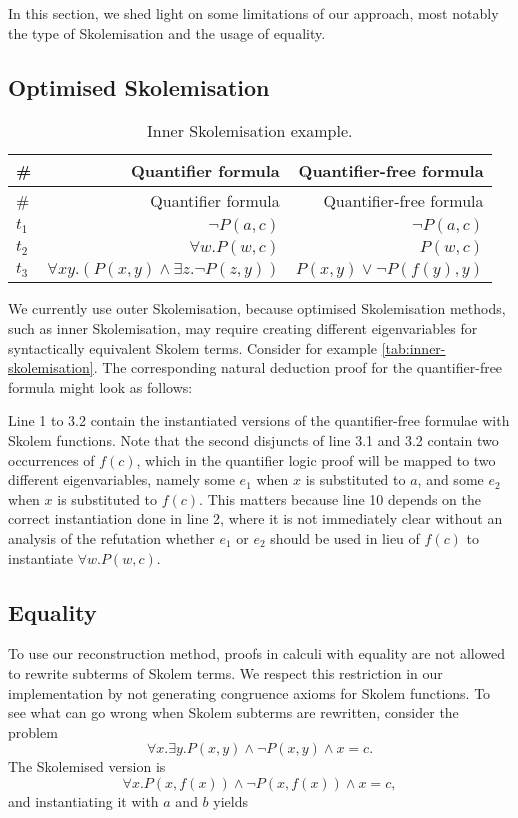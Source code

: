 \documentclass[]{article}
\begin{document}
In this section, we shed light on some limitations of our approach, most
notably the type of Skolemisation and the usage of equality.

\subsection{Optimised Skolemisation}\label{optimised-skolemisation}

\begin{longtable}[c]{@{}lrr@{}}
\caption{Inner Skolemisation example.
\label{tab:inner-skolemisation}}\tabularnewline
\toprule
\# & Quantifier formula & Quantifier-free formula\tabularnewline
\midrule
\endfirsthead
\toprule
\# & Quantifier formula & Quantifier-free formula\tabularnewline
\midrule
\endhead
\(t_1\) & \(\lnot P(a, c)\) & \(\lnot P(a, c)\)\tabularnewline
\(t_2\) & \(\forall w. P(w, c)\) & \(P(w, c)\)\tabularnewline
\(t_3\) & \(\forall x y. (P(x, y) \land \exists z. \lnot P(z, y))\) &
\(P(x, y) \lor \lnot P(f(y), y)\)\tabularnewline
\bottomrule
\end{longtable}

We currently use outer Skolemisation, because optimised Skolemisation
methods, such as inner Skolemisation, may require creating different
eigenvariables for syntactically equivalent Skolem terms. Consider for
example \autoref{tab:inner-skolemisation}. The corresponding natural
deduction proof for the quantifier-free formula might look as follows:



Line 1 to 3.2 contain the instantiated versions of the quantifier-free
formulae with Skolem functions. Note that the second disjuncts of line
3.1 and 3.2 contain two occurrences of \(f(c)\), which in the quantifier
logic proof will be mapped to two different eigenvariables, namely some
\(e_1\) when \(x\) is substituted to \(a\), and some \(e_2\) when \(x\)
is substituted to \(f(c)\). This matters because line 10 depends on the
correct instantiation done in line 2, where it is not immediately clear
without an analysis of the refutation whether \(e_1\) or \(e_2\) should
be used in lieu of \(f(c)\) to instantiate \(\forall w. P(w, c)\).

\subsection{Equality}\label{equality}

To use our reconstruction method, proofs in calculi with equality are
not allowed to rewrite subterms of Skolem terms. We respect this
restriction in our implementation by not generating congruence axioms
for Skolem functions. To see what can go wrong when Skolem subterms are
rewritten, consider the problem
\[\forall x. \exists y. P(x, y) \land \lnot  P(x, y) \land x = c.\] The
Skolemised version is
\[\forall x. P(x, f(x)) \land \lnot P(x, f(x)) \land x = c,\] and
instantiating it with \(a\) and \(b\) yields
\end{document}
